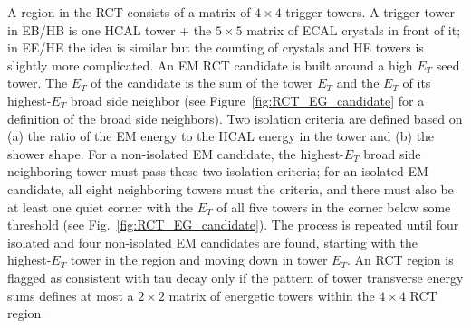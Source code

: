 \documentclass[dissertation.tex]{subfiles}
\begin{document}
A region in the RCT consists of a matrix of $4\times4$ trigger towers.  A trigger tower in EB/HB is one HCAL tower + the $5\times5$ matrix of ECAL crystals in front of it; in EE/HE the idea is similar but the counting of crystals and HE towers is slightly more complicated.  An EM RCT candidate is built around a high $E_{T}$ seed tower.  The $E_{T}$ of the candidate is the sum of the tower $E_{T}$ and the $E_{T}$ of its highest-$E_{T}$ broad side neighbor (see Figure~\ref{fig:RCT_EG_candidate} for a definition of the broad side neighbors).  Two isolation criteria are defined based on (a) the ratio of the EM energy to the HCAL energy in the tower and (b) the shower shape.  For a non-isolated EM candidate, the highest-$E_{T}$ broad side neighboring tower must pass these two isolation criteria; for an isolated EM candidate, all eight neighboring towers must the criteria, and there must also be at least one quiet corner with the $E_{T}$ of all five towers in the corner below some threshold (see Fig.~\ref{fig:RCT_EG_candidate}).  The process is repeated until four isolated and four non-isolated EM candidates are found, starting with the highest-$E_{T}$ tower in the region and moving down in tower $E_{T}$.  An RCT region is flagged as consistent with tau decay only if the pattern of tower transverse energy sums defines at most a $2\times2$ matrix of energetic towers within the $4\times4$ RCT region.
\end{document}
